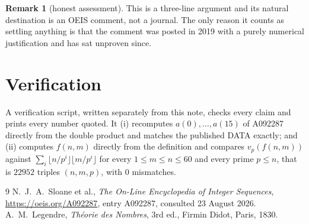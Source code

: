 \documentclass[11pt,a4paper]{article}
\theoremstyle{plain}
\theoremstyle{definition}
\newtheorem*{remark}{Remark}
\begin{document}
\begin{remark}[honest assessment]
This is a three-line argument and its natural destination is an OEIS comment, not a journal.
The only reason it counts as settling anything is that the comment was posted in 2019 with a
purely numerical justification and has sat unproven since.
\end{remark}

\section{Verification}

A verification script, written separately from this note, checks every claim and prints every
number quoted. It (i) recomputes $a(0),\dots,a(15)$ of A092287 directly from the double
product and matches the published DATA exactly; and (ii) computes $f(n,m)$ directly from the
definition and compares $v_p(f(n,m))$ against $\sum_i\lfloor n/p^i\rfloor\lfloor
m/p^i\rfloor$ for every $1\le m\le n\le60$ and every prime $p\le n$, that is $22952$ triples
$(n,m,p)$, with $0$ mismatches.

\begin{thebibliography}{9}
 N.~J.~A.~Sloane et al., \emph{The On-Line Encyclopedia of Integer Sequences},
\url{https://oeis.org/A092287}, entry A092287, consulted 23 August 2026.
 A.~M.~Legendre, \emph{Th\'eorie des Nombres}, 3rd ed., Firmin Didot,
Paris, 1830.
\end{thebibliography}
\end{document}
